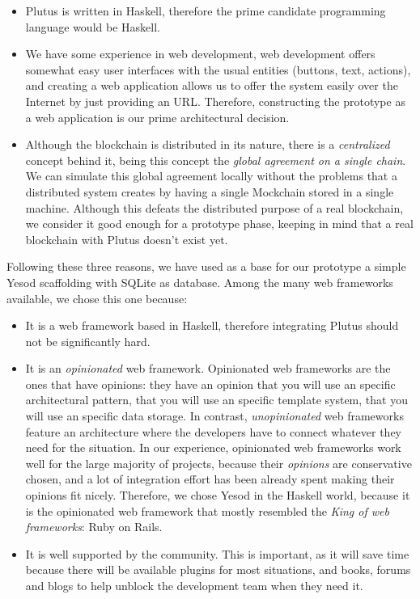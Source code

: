 \documentclass{article}
\begin{document}
\begin{itemize}
  \item Plutus is written in Haskell, therefore the prime candidate programming language would be Haskell.
  \item We have some experience in web development, web development offers somewhat easy user interfaces with the usual entities (buttons, text, actions), and creating a web application allows us to offer the system easily over the Internet by just providing an URL. Therefore, constructing the prototype as a web application is our prime architectural decision.
  \item Although the blockchain is distributed in its nature, there is a \emph{centralized} concept behind it, being this concept the \emph{global agreement on a single chain}. We can simulate this global agreement locally without the problems that a distributed system creates by having a single Mockchain stored in a single machine. Although this defeats the distributed purpose of a real blockchain, we consider it good enough for a prototype phase, keeping in mind that a real blockchain with Plutus doesn't exist yet.
\end{itemize}

Following these three reasons, we have used as a base for our prototype a simple Yesod scaffolding with SQLite as database. Among the many web frameworks available, we chose this one because:

\begin{itemize}
  \item It is a web framework based in Haskell, therefore integrating Plutus should not be significantly hard.
  \item It is an \emph{opinionated} web framework. Opinionated web frameworks are the ones that have opinions: they have an opinion that you will use an specific architectural pattern, that you will use an specific template system, that you will use an specific data storage. In contrast, \emph{unopinionated} web frameworks feature an architecture where the developers have to connect whatever they need for the situation. In our experience, opinionated web frameworks work well for the large majority of projects, because their \emph{opinions} are conservative chosen, and a lot of integration effort has been already spent making their opinions fit nicely. Therefore, we chose Yesod in the Haskell world, because it is the opinionated web framework that mostly resembled the \emph{King of web frameworks}: Ruby on Rails.
  \item It is well supported by the community. This is important, as it will save time because there will be available plugins for most situations, and books, forums and blogs to help unblock the development team when they need it.
\end{itemize}
\end{document}
